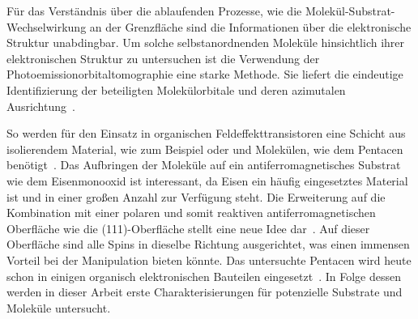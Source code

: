     Für das Verständnis über die ablaufenden Prozesse, wie die Molekül-Substrat-Wechselwirkung an der Grenzfläche sind die Informationen über die elektronische Struktur unabdingbar.
    Um solche selbstanordnenden Moleküle hinsichtlich ihrer elektronischen Struktur zu untersuchen ist die Verwendung der Photoemissionorbitaltomographie eine starke Methode.
    Sie liefert die eindeutige Identifizierung der beteiligten Molekülorbitale und deren azimutalen Ausrichtung~\cite{MM_2, MM_5}.
    
    So werden für den Einsatz in organischen Feldeffekttransistoren eine Schicht aus isolierendem Material, wie zum Beispiel  oder  und Molekülen, wie dem Pentacen benötigt~\cite{5A_13}.
    Das Aufbringen der Moleküle auf ein antiferromagnetisches Substrat wie dem Eisenmonooxid ist interessant, da Eisen ein häufig eingesetztes Material ist und in einer großen Anzahl zur Verfügung steht. %
    Die Erweiterung auf die Kombination mit einer polaren und somit reaktiven antiferromagnetischen Oberfläche wie die  (111)-Oberfläche stellt eine neue Idee dar~\cite{cappus_hydroxyl_1993}.
    Auf dieser Oberfläche sind alle Spins in dieselbe Richtung ausgerichtet, was einen immensen Vorteil bei der Manipulation bieten könnte.
    Das untersuchte Pentacen wird heute schon in einigen organisch elektronischen Bauteilen eingesetzt~\cite{5A_4}.
    In Folge dessen werden in dieser Arbeit erste Charakterisierungen für potenzielle Substrate und Moleküle untersucht.




